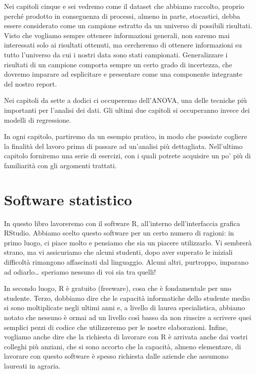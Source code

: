 \documentclass[a4paper,12pt,oneside]{book}
\begin{document}
Nei capitoli cinque e sei vedremo come il dataset che abbiamo raccolto, proprio perché prodotto in conseguenza di processi, almeno in parte, stocastici, debba essere considerato come un campione estratto da un universo di possibili risultati. Visto che vogliamo sempre ottenere informazioni generali, non saremo mai interessati solo ai risultati ottenuti, ma cercheremo di ottenere informazioni su tutto l'universo da cui i nostri data sono stati campionati. Generalizzare i risultati di un campione comporta sempre un certo grado di incertezza, che dovremo imparare ad esplicitare e presentare come una componente integrante del nostro report.

Nei capitoli da sette a dodici ci occuperemo dell'ANOVA, una delle tecniche più importanti per l'analisi dei dati. Gli ultimi due capitoli si occuperanno invece dei modelli di regressione.

In ogni capitolo, partiremo da un esempio pratico, in modo che possiate cogliere la finalità del lavoro prima di passare ad un'analisi più dettagliata. Nell'ultimo capitolo forniremo una serie di esercizi, con i quali potrete acquisire un po' più di familiarità con gli argomenti trattati.

\hypertarget{software-statistico}{%
\section*{Software statistico}\label{software-statistico}}

In questo libro lavoreremo con il software R, all'interno dell'interfaccia grafica RStudio. Abbiamo scelto questo software per un certo numero di ragioni: in primo luogo, ci piace molto e pensiamo che sia un piacere utilizzarlo. Vi sembrerà strano, ma vi assicuriamo che alcuni studenti, dopo aver superato le iniziali difficoltà rimangono affascinati dal linguaggio. Alcuni altri, purtroppo, imparano ad odiarlo\ldots{} speriamo nessuno di voi sia tra quelli!

In secondo luogo, R è gratuito (freeware), cosa che è fondamentale per uno studente. Terzo, dobbiamo dire che le capacità informatiche dello studente medio si sono moltiplicate negli ultimi anni e, a livello di laurea specialistica, abbiamo notato che nessuno è ormai ad un livello così basso da non riuscire a scrivere quei semplici pezzi di codice che utilizzeremo per le nostre elaborazioni. Infine, vogliamo anche dire che la richiesta di lavorare con R è arrivata anche dai vostri colleghi più anziani, che si sono accorto che la capacità, almeno elementare, di lavorare con questo software è spesso richiesta dalle aziende che assumono laureati in agraria.
\end{document}
